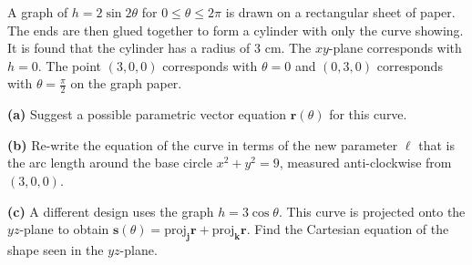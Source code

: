 \begin{problem}
\begin{minipage}{0.55\textwidth}
A graph of $h = 2\sin 2\theta$ for $0 \le \theta \le 2\pi$ is drawn on a rectangular sheet of paper. The ends are then glued together to form a cylinder with only the curve showing. It is found that the cylinder has a radius of $3$ cm. The $xy$-plane corresponds with $h = 0$. The point $(3,0,0)$ corresponds with $\theta = 0$ and $(0,3,0)$ corresponds with $\theta = \frac{\pi}{2}$ on the graph paper.

\textbf{(a)} Suggest a possible parametric vector equation $\mathbf{r}(\theta)$ for this curve. 

\textbf{(b)} Re-write the equation of the curve in terms of the new parameter $\ell$ that is the arc length around the base circle $x^2 + y^2 = 9$, measured anti-clockwise from $(3,0,0)$.

\textbf{(c)} A different design uses the graph $h = 3\cos \theta$. This curve is projected onto the $yz$-plane to obtain $\mathbf{s}(\theta) = \text{proj}_{\mathbf{j}}\mathbf{r} + \text{proj}_{\mathbf{k}}\mathbf{r}$. Find the Cartesian equation of the shape seen in the $yz$-plane.
\end{minipage}%
\hfill
\begin{minipage}{0.4\textwidth}
\begin{center}
\end{center}
\end{minipage}
\end{problem}

